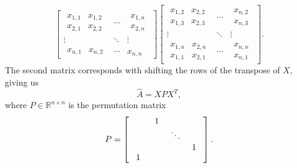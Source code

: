 \begin{equation}
\begin{bmatrix}
    \begin{matrix}
        x_{1,1} & x_{1,2} \\
        x_{2,1} & x_{2,2}
    \end{matrix}
    & \cdots &
    \begin{matrix}
        x_{1,n} \\ x_{2,n}
    \end{matrix} \\
    \vdots & \ddots & \vdots \\
    \begin{matrix}
        x_{n,1} & x_{n,2}
    \end{matrix}
    & \cdots & x_{n,n}
\end{bmatrix}
\begin{bmatrix}
    \begin{matrix}
        x_{1,2} & x_{2,2} \\
        x_{1,3} & x_{2,3}
    \end{matrix}
    & \cdots &
    \begin{matrix}
        x_{n,2} \\ x_{n,3}
    \end{matrix} \\
    \vdots & \ddots & \vdots \\
    \begin{matrix}
        x_{1,n} & x_{2,n} \\
        x_{1,1} & x_{2,1}
    \end{matrix}
    & \cdots & \begin{matrix}
        x_{n,n} \\ x_{n,1}
    \end{matrix}
\end{bmatrix}.
\end{equation}
The second matrix corresponds with shifting the rows of the transpose of $X$, giving us
\begin{equation}
    \hat{A} = XPX^T,
\end{equation}
where $P\in\mathbb{R}^{n \times n}$ is the permutation matrix
\begin{equation}
    P =
    \left[
    \begin{array}{cccc}
         &\SetToWidest{1}  \\
         && \ddots \\
         &&& \SetToWidest{1} \\
         \SetToWidest{1}
    \end{array}
    \right].
\end{equation}


